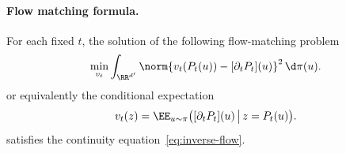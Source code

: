 \paragraph{Flow matching formula.}
\begin{prop}
For each fixed $t$, the solution of the following flow-matching problem
\begin{equation}
\min_{v_t} \int_{\RR^{d'}} \norm{v_t(P_t(u)) - [\partial_t P_t](u)}^2 \, \d\pi(u). \label{eq:flow-matching}
\end{equation}
or equivalently the conditional expectation
\begin{equation}\label{eq:flow-match-conditional}
v_t(z) = \EE_{u \sim \pi} \big( [\partial_t P_t](u) \, \big| \, z = P_t(u) \big).
\end{equation}
satisfies the continuity equation~\eqref{eq:inverse-flow}.
\end{prop}
